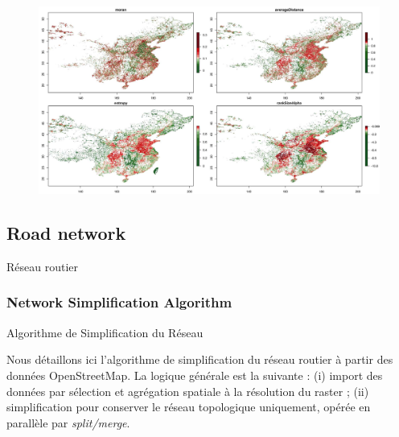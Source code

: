 \begin{figure}
\includegraphics[width=\linewidth]{Figures/Final/A-staticcorrelations-morphocn.jpg}
\end{figure}

\subsection{Road network}{Réseau routier}




\subsubsection{Network Simplification Algorithm}{Algorithme de Simplification du Réseau}


Nous détaillons ici l'algorithme de simplification du réseau routier à partir des données OpenStreetMap. La logique générale est la suivante : (i) import des données par sélection et agrégation spatiale à la résolution du raster ; (ii) simplification pour conserver le réseau topologique uniquement, opérée en parallèle par \emph{split/merge}.



